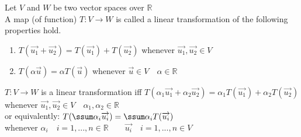 \documentclass[12pt]{article}
\renewcommand{\v}[1]{\overrightarrow{#1}}
\newcommand{\real}[0]{\mathbb{R}}
\newenvironment{remark}{\block[Remark]}{\endblock}
\newenvironment{definition}{\block[Definition]}{\endblock}
\begin{document}
	\begin{definition}
		Let $V$ and $W$ be two vector spaces over $\real$ \\
		A map (of function) $T: V \rightarrow W$ is called a linear transformation of the following properties hold.
		
		\begin{enumerate}
			\item $T(\v{u_1} + \v{u_2}) = T(\v{u_1}) + T(\v{u_2})$ whenever $\v{u_1}, \v{u_2} \in V$
			
			\item $T(\alpha \v{u}) = \alpha T(\v{u})$ whenever $\v{u} \in V \quad \alpha \in \real$
		\end{enumerate}
		
	\end{definition}
	
	\begin{remark}
		$T : V  \rightarrow W$ is a linear transformation iff $T(\alpha_1 \v{u_1} + \alpha_2 \v{u_2}) = \alpha_1 T(\v{u_1}) + \alpha_2 T(\v{u_2})$ whenever $\v{u_1}, \v{u_2} \in V \quad \alpha_1, \alpha_2 \in \real$ \\
		or equivalently: $T(\ssum \alpha_i \v{u_i}) = \ssum \alpha_i T(\v{u_i})$ \\
		whenever $\alpha_i \quad i = 1, ..., n \in \real \qquad \v{u_i} \quad i = 1, ..., n \in V$
	\end{remark}
	
\end{document}
